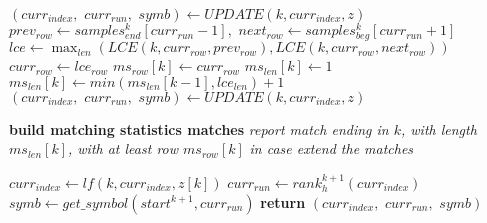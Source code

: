 \begin{algorithm}
\begin{algorithmic}[1]
    \State $(curr_{index},\,\,curr_{run},\,\,symb)\gets UPDATE(k, curr_{index},
    z)$ 
    \EndIf
    \Else
    \State $prev_{row}\gets samples_{end}^k[curr_{run}-1],\,\,next_{row}\gets
    samples_{beg}^k[curr_{run}+1]$ 
    \State $lce\gets \max_{len} (LCE(k, curr_{row}, prev_{row}), LCE(k,
    curr_{row}, next_{row}))$
    \State $curr_{row}\gets lce_{row}$
    \State $ms_{row}[k]\gets curr_{row}$
    \State $ms_{len}[k] \gets 1$
    \Else
    \State $ms_{len}[k] \gets min(ms_{len}[k-1], lce_{len})+1$
    \EndIf
    \State $(curr_{index},\,\,curr_{run},\,\,symb)\gets UPDATE(k, curr_{index},
    z)$ 
    \EndIf
    \EndIf
    \EndIf
    \EndIf
    \EndFor
    
    \For {\textit{every} $k\in[0,|ms_{row}|)$}
    \Comment \textbf{build matching statistics matches}
    \State \textit{report match ending in $k$, with length $ms_{len}[k]$, with
    at least row $ms_{row}[k]$}
    \EndIf
    \EndFor
    \textit{in case extend the matches}
    \EndFunction
    
  \end{algorithmic}
  \caption{Algoritmo per match con matching-statistics (MS) e LCE}
  \label{algo:matchlce}
\end{algorithm}

\begin{algorithm}
  \begin{algorithmic}[1]
    \State $curr_{index}\gets lf(k, curr_{index}, z[k])$
    \State $curr_{run}\gets rank_h^{k+1}(curr_{index})$
    \State $symb\gets get\_symbol(start^{k+1}, curr_{run})$
    \State \textbf{return} $(curr_{index},\,\,curr_{run},\,\,symb)$
    \EndFunction
  \end{algorithmic}
  \caption{Algoritmo per l'update usando le matching statistics}
  \label{algo:updatems}
\end{algorithm}





